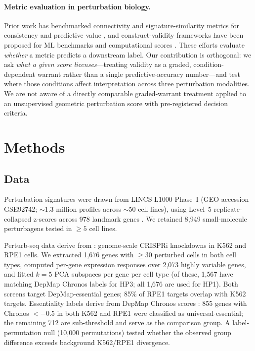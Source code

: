 \documentclass[11pt]{article}
\begin{document}
\paragraph{Metric evaluation in perturbation biology.}
Prior work has benchmarked connectivity and signature-similarity metrics
for consistency and predictive value
\citep{subramanian2017next,li2020comprehensive,napolitano2021reconciling},
and construct-validity
frameworks have been proposed for ML benchmarks and computational scores
\citep{freiesleben2025benchmarking,watson2025measuring}. These efforts
evaluate \emph{whether} a metric predicts a downstream label. Our
contribution is orthogonal: we ask \emph{what a given score licenses}---treating
validity as a graded, condition-dependent warrant rather than a single
predictive-accuracy number---and test where those conditions affect
interpretation across three perturbation modalities. We are not aware of
a directly comparable graded-warrant treatment applied to an unsupervised
geometric perturbation score with pre-registered decision criteria.

\section{Methods}

\subsection{Data}

Perturbation signatures were drawn from LINCS L1000 Phase~I (GEO accession
GSE92742; $\sim$1.3 million profiles across $\sim$50 cell lines),
using Level~5 replicate-collapsed z-scores across 978 landmark genes
\citep{subramanian2017next,keenan2018library}. We retained 8{,}949
small-molecule perturbagens tested in $\geq5$ cell lines.

Perturb-seq data derive from \citet{replogle2022mapping}: genome-scale
CRISPRi knockdowns in K562 and RPE1 cells. We extracted 1{,}676 genes
with $\geq$30 perturbed cells in both cell types, computed per-gene
expression responses over 2{,}073 highly variable genes, and fitted
$k = 5$ PCA subspaces per gene per cell type (of these, 1{,}567 have
matching DepMap Chronos labels for HP3; all 1{,}676 are used for HP1).
Both screens target DepMap-essential genes; 85\% of RPE1 targets overlap
with K562 targets. Essentiality labels derive from DepMap Chronos scores
\citep{dempster2021chronos}: 855 genes with Chronos $< -0.5$ in both
K562 and RPE1 were classified as universal-essential; the remaining 712
are sub-threshold and serve as the comparison group. A label-permutation
null (10{,}000 permutations) tested whether the observed group difference
exceeds background K562/RPE1 divergence.
\end{document}
